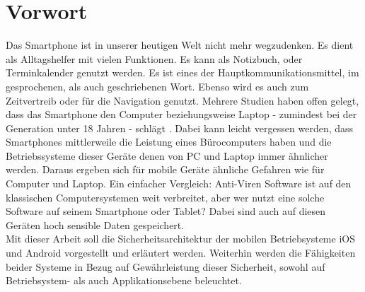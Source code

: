 \section{Vorwort}
	Das Smartphone ist in unserer heutigen Welt nicht mehr wegzudenken. Es dient
	als Alltagshelfer mit vielen Funktionen. Es kann als Notizbuch, oder
	Terminkalender genutzt werden. Es ist eines der Hauptkommunikationsmittel, im
	gesprochenen, als auch geschriebenen Wort. Ebenso wird es auch zum
	Zeitvertreib oder für die Navigation genutzt. Mehrere Studien haben offen 
	gelegt, dass das Smartphone den Computer beziehungsweise Laptop - zumindest
	bei der Generation unter 18 Jahren - schlägt
	\cite{BitkomStudieJugend2014}
	\cite{MPFSStudie2013}.
	Dabei kann leicht vergessen werden, dass Smartphones mittlerweile die Leistung
	eines Bürocomputers haben und die Betriebssysteme dieser Geräte denen von PC
	und Laptop immer ähnlicher werden. Daraus ergeben sich für mobile Geräte
	ähnliche Gefahren wie für Computer und Laptop. Ein einfacher Vergleich:
	Anti-Viren Software ist auf den klassischen Computersystemen weit verbreitet,
	aber wer nutzt eine solche Software auf seinem Smartphone oder Tablet? Dabei
	sind auch auf diesen Geräten hoch sensible Daten gespeichert.\\
	Mit dieser Arbeit soll die Sicherheitsarchitektur der mobilen Betriebsysteme
	iOS und Android vorgestellt und erläutert werden. Weiterhin werden die
	Fähigkeiten beider Systeme in Bezug auf Gewährleistung dieser Sicherheit,
	sowohl auf Betriebsystem- als auch Applikationsebene beleuchtet.
